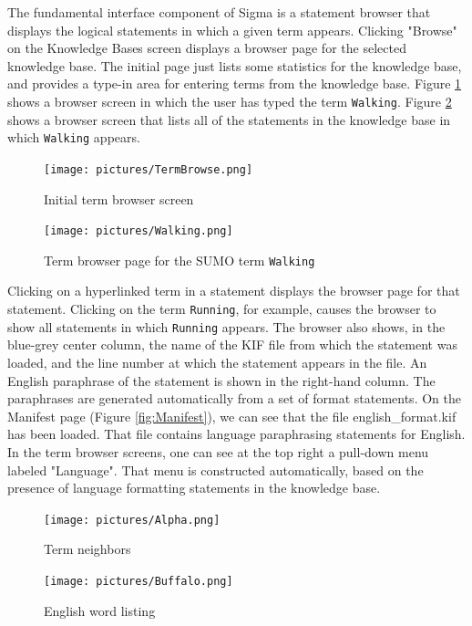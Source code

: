 \documentclass{book}
\begin{document}
The fundamental interface component of Sigma is a statement browser that
displays the logical statements in which a given term appears.  Clicking
"Browse" on the Knowledge Bases screen displays a browser page for
the selected knowledge base.  The initial page just lists some statistics for the knowledge
base, and provides a type-in area for entering terms from the knowledge base.
Figure \ref{fig:TermBrowse} shows a browser screen in which the user has typed
the term {\tt Walking}.  Figure \ref{fig:Walking} shows a browser screen that
lists all of the statements in the knowledge base in which {\tt Walking}
appears.

\begin{figure}
  \centering
  \texttt{[image: pictures/TermBrowse.png]}
  \caption{Initial term browser screen}
  \label{fig:TermBrowse}
\end{figure}

\begin{figure}
  \centering
  \texttt{[image: pictures/Walking.png]}
  \caption{Term browser page for the SUMO term {\tt Walking}}
  \label{fig:Walking}
\end{figure}

Clicking on a hyperlinked term in a statement displays the browser page for that
statement.  Clicking on the term \texttt{Running}, for example, causes the browser to
show all statements in which \texttt{Running} appears.  The browser also shows, in the
blue-grey center column, the name of the KIF file from which the statement was
loaded, and the line number at which the statement appears in the file.  An
English paraphrase of the statement is shown in the right-hand column.  The
paraphrases are generated automatically from a set of format statements.  On the
Manifest page (Figure \ref{fig:Manifest}), we can see that the
file english_format.kif has been loaded.  That file contains language
paraphrasing statements for English.  In the term browser screens, one can see
at the top right a pull-down menu labeled "Language".  That menu is constructed
automatically, based on the presence of language formatting statements in the
knowledge base.

\begin{figure}
  \centering
  \texttt{[image: pictures/Alpha.png]}
  \caption{Term neighbors}
  \label{fig:Alpha}
\end{figure}

\begin{figure}
  \centering
  \texttt{[image: pictures/Buffalo.png]}
  \caption{English word listing}
  \label{fig:Buffalo}
\end{figure}
\end{document}
